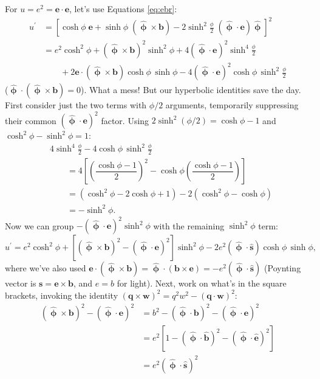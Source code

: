 \documentclass[12pt]{article}
\renewcommand{\vv}[1]{\mathbf{#1}}
\newcommand{\hatphi}{\bm{\hat{\upphi}}}
\begin{document}
For $u = e^2 = \vv e \cdot \vv e$, let's use Equations \ref{eq:ebr}:
\begin{equation*}
\begin{aligned}
u^\prime &= \left[ \cosh{\phi} \; \vv e + \sinh{\phi} \; (\hatphi \times \vv b) - 2 \sinh^2 \frac{\phi}{2} \; (\hatphi \cdot \vv e) \hatphi \right]^2 \\
&= e^2 \cosh^2{\phi} + (\hatphi \times \vv b)^2 \sinh^2{\phi} + 4(\hatphi \cdot \vv e)^2 \sinh^4{\frac{\phi}{2}} \\
& \qquad + 2 \vv e \cdot (\hatphi \times \vv b) \cosh{\phi} \, \sinh{\phi} - 4 (\hatphi \cdot \vv e)^2 \cosh{\phi} \,\sinh^2{\frac{\phi}{2}}
\end{aligned}
\end{equation*}
($\hatphi \cdot (\hatphi \times \vv b) = 0$). What a mess! But our hyperbolic identities save the day. First consider just the two terms with $\phi / 2$ arguments, temporarily suppressing their common $(\hatphi \cdot \vv e)^2$ factor. Using $2\sinh^2(\phi/2) = \cosh \phi - 1$ and $\cosh^2 \phi - \sinh^2 \phi = 1$:
\begin{equation*}
\begin{aligned}
& 4 \sinh^4{\frac{\phi}{2}} - 4 \cosh{\phi} \,\sinh^2{\frac{\phi}{2}} \\[2pt]
& \qquad  = 4 \left[ \left( \dfrac{\cosh{\phi} - 1}{2} \right)^2 - \cosh{\phi} \left( \dfrac{\cosh{\phi} - 1}{2} \right) \right] \\[4pt]
& \qquad = \left( \cosh^2{\phi} - 2 \cosh{\phi} + 1 \right) - 2 \left( \cosh^2{\phi} - \cosh{\phi} \right) \\[3pt]
& \qquad = - \sinh^2{\phi} .
\end{aligned}
\end{equation*}
Now we can group $- (\hatphi \cdot \vv e)^2 \sinh^2{\phi}$ with the remaining $\sinh^2{\phi}$ term:
\begin{equation*}
u^\prime = e^2 \cosh^2{\phi} + \left[ (\hatphi \times \vv b)^2 - (\hatphi \cdot \vv e)^2 \right] \sinh^2{\phi} - 2 e^2 ( \hatphi \cdot \vv{\hat s}) \cosh{\phi} \, \sinh{\phi} ,
\end{equation*}
where we've also used $\vv e \cdot (\hatphi \times \vv b) = \hatphi \cdot (\vv b \times \vv e) = - e^2 (\hatphi \cdot \vv{\hat s})$ (Poynting vector is $\vv s = \vv e \times \vv b$, and $e = b$ for light). Next, work on what's in the square brackets, invoking the identity $(\vv q \times \vv w)^2 = q^2 w^2 - (\vv q \cdot \vv w)^2$:
\begin{equation*}
\begin{aligned}
(\hatphi \times \vv b)^2 - (\hatphi \cdot \vv e)^2 &= b^2 - (\hatphi \cdot \vv b)^2 - (\hatphi \cdot \vv e)^2 \\
&= e^2 \left[ 1 - (\hatphi \cdot \vv{\hat b})^2 - (\hatphi \cdot \vv{\hat e})^2 \right] \\
&= e^2 ( \hatphi \cdot \vv{\hat s} )^2
\end{aligned}
\end{equation*}
\end{document}

